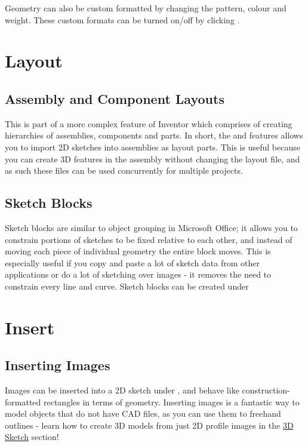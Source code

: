 \begin{enumerate}
Geometry can also be custom formatted by changing the pattern, colour and weight. These custom formats can be turned on/off by clicking .

\section{Layout}

\subsection{Assembly and Component Layouts}
This is part of a more complex feature of Inventor which comprises of creating hierarchies of assemblies, components and parts. In short, the  and  features allows you to import 2D sketches into assemblies as layout parts. This is useful because you can create 3D features in the assembly without changing the layout file, and as such these files can be used concurrently for multiple projects.

\subsection{Sketch Blocks}
Sketch blocks are similar to object grouping in Microsoft Office; it allows you to constrain portions of sketches to be fixed relative to each other, and instead of moving each piece of individual geometry the entire block moves. This is especially useful if you copy and paste a lot of sketch data from other applications or do a lot of sketching over images - it removes the need to constrain every line and curve. Sketch blocks can be created under 

\section{Insert}

\subsection{Inserting Images}
Images can be inserted into a 2D sketch under , and behave like construction-formatted rectangles in terms of geometry. Inserting images is a fantastic way to model objects that do not have CAD files, as you can use them to freehand outlines - learn how to create 3D models from just 2D profile images in the \hyperref[section: 3D Sketches]{3D Sketch} section!


\end{enumerate}
